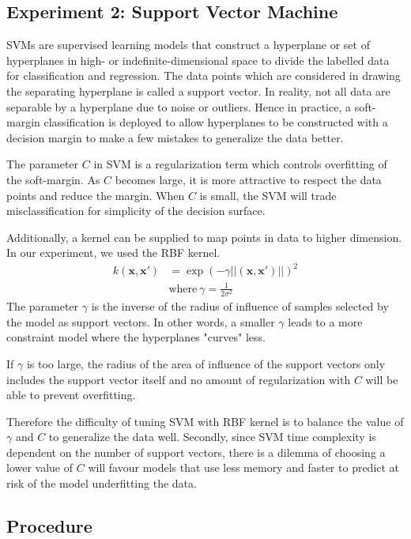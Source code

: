 \documentclass[letterpaper]{article}
\begin{document}
\subsection{Experiment 2: Support Vector Machine}
SVMs are supervised learning models that construct a hyperplane or set of hyperplanes in high-
or indefinite-dimensional space to divide the labelled data for classification and regression.
The data points which are considered in drawing the separating hyperplane is called a support
vector. In reality, not all data are separable by a hyperplane due to noise or outliers. Hence in
practice, a soft-margin classification is deployed to allow hyperplanes to be constructed
with a decision margin to make a few mistakes to generalize the data better.

The parameter $\textit{C}$ in SVM is a regularization term which controls overfitting of the soft-margin.
As $\textit{C}$ becomes large, it is more attractive to respect the data points and reduce
the margin. When $\textit{C}$ is small, the SVM will trade misclassification for simplicity
of the decision surface.

Additionally, a kernel can be supplied to map points in data to higher dimension. In our
experiment, we used the RBF kernel.
\begin{align*}
k (\textbf{x},\textbf{x}') &= \exp(-\gamma||(\textbf{x},\textbf{x}')||)^2 \\
&\text{where} \ \gamma = \frac{1}{2\sigma^2}
\end{align*}
The parameter $\gamma$ is the inverse of the radius of influence of samples selected by the
model as support vectors. In other words, a smaller $\gamma$ leads to a more constraint
model where the hyperplanes "curves" less.

If $\gamma$ is too large, the radius of the area of influence of the support vectors only
includes the support vector itself and no amount of regularization with $\textit{C}$ will be
able to prevent overfitting.

Therefore the difficulty of tuning SVM with RBF kernel is to balance the value of
$\gamma$ and $\textit{C}$ to generalize the data well. Secondly, since SVM time complexity
is dependent on the number of support vectors, there is a dilemma of choosing a lower value
of $\textit{C}$ will favour models that use less memory and faster to predict at risk of
the model underfitting the data.

\subsection{Procedure}
\end{document}
